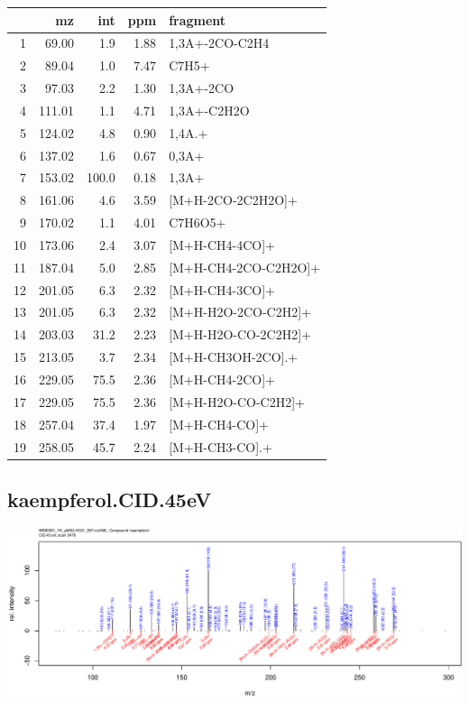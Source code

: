 \documentclass[]{article}
\begin{document}
\begin{table}[ht]
\centering
\begin{tabular}{rrrrl}
  \toprule
 & mz & int & ppm & fragment \\ 
  \midrule
1 & 69.00 & 1.9 & 1.88 & 1,3A+-2CO-C2H4 \\ 
  2 & 89.04 & 1.0 & 7.47 & C7H5+ \\ 
  3 & 97.03 & 2.2 & 1.30 & 1,3A+-2CO \\ 
  4 & 111.01 & 1.1 & 4.71 & 1,3A+-C2H2O \\ 
  5 & 124.02 & 4.8 & 0.90 & 1,4A.+ \\ 
  6 & 137.02 & 1.6 & 0.67 & 0,3A+ \\ 
  7 & 153.02 & 100.0 & 0.18 & 1,3A+ \\ 
  8 & 161.06 & 4.6 & 3.59 & [M+H-2CO-2C2H2O]+ \\ 
  9 & 170.02 & 1.1 & 4.01 & C7H6O5+ \\ 
  10 & 173.06 & 2.4 & 3.07 & [M+H-CH4-4CO]+ \\ 
  11 & 187.04 & 5.0 & 2.85 & [M+H-CH4-2CO-C2H2O]+ \\ 
  12 & 201.05 & 6.3 & 2.32 & [M+H-CH4-3CO]+ \\ 
  13 & 201.05 & 6.3 & 2.32 & [M+H-H2O-2CO-C2H2]+ \\ 
  14 & 203.03 & 31.2 & 2.23 & [M+H-H2O-CO-2C2H2]+ \\ 
  15 & 213.05 & 3.7 & 2.34 & [M+H-CH3OH-2CO].+ \\ 
  16 & 229.05 & 75.5 & 2.36 & [M+H-CH4-2CO]+ \\ 
  17 & 229.05 & 75.5 & 2.36 & [M+H-H2O-CO-C2H2]+ \\ 
  18 & 257.04 & 37.4 & 1.97 & [M+H-CH4-CO]+ \\ 
  19 & 258.05 & 45.7 & 2.24 & [M+H-CH3-CO].+ \\ 
   \bottomrule
\end{tabular}
\end{table}

\clearpage\subsection{kaempferol.CID.45eV}
\includegraphics[width=\textwidth]{WEB350_files/figure-latex/unnamed-chunk-3-25}
\end{document}
